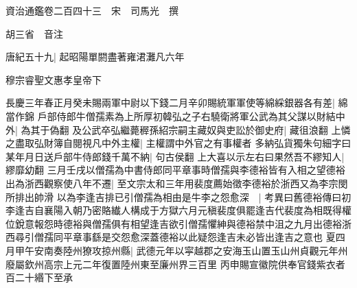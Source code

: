資治通鑑卷二百四十三　宋　司馬光　撰

胡三省　音注

唐紀五十九|{
	起昭陽單閼盡著雍涒灘凡六年}


穆宗睿聖文惠孝皇帝下

長慶三年春正月癸未賜兩軍中尉以下錢二月辛卯賜統軍軍使等綿綵銀器各有差|{
	綿當作錦}
戶部侍郎牛僧孺素為上所厚初韓弘之子右驍衛將軍公武為其父謀以財結中外|{
	為其于偽翻}
及公武卒弘繼薨稺孫紹宗嗣主藏奴與吏訟於御史府|{
	藏徂浪翻}
上憐之盡取弘財簿自閱視凡中外主權|{
	主權謂中外官之有事權者}
多納弘貨獨朱句細字曰某年月日送戶部牛侍郎錢千萬不納|{
	句古侯翻}
上大喜以示左右曰果然吾不繆知人|{
	繆靡幼翻}
三月壬戌以僧孺為中書侍郎同平章事時僧孺與李德裕皆有入相之望德裕出為浙西觀察使八年不遷|{
	至文宗太和三年用裴度薦始徵李德裕於浙西又為李宗閔所排出帥滑}
以為李逢吉排已引僧孺為相由是牛李之怨愈深　|{
	考異曰舊德裕傳曰初李逢吉自襄陽入朝乃密賂纎人構成于方獄六月元稹裴度俱罷逢吉代裴度為相既得權位銳意報怨時德裕與僧孺俱有相望逢吉欲引僧孺懼紳與德裕禁中沮之九月出德裕浙西尋引僧孺同平章事繇是交怨愈深蓋德裕以此疑怨逢吉未必皆出逢吉之意也}
夏四月甲午安南奏陸州獠攻掠州縣|{
	武德元年以寜越郡之安海玉山置玉山州貞觀元年州廢屬欽州高宗上元二年復置陸州東至廉州界三百里}
丙申賜宣徽院供奉官錢紫衣者百二十緡下至承

